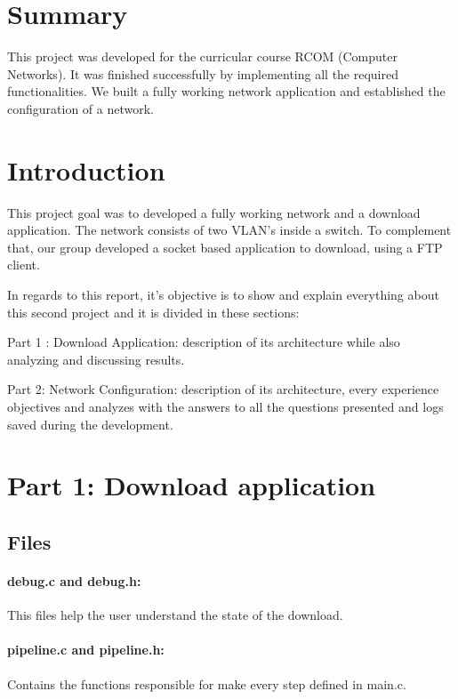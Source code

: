\documentclass[compilation.tex]{subfiles}
\begin{document}
	
	\section{Summary}
	\label{sec:summary}
	This project was developed for the curricular course RCOM (Computer Networks). It was finished successfully by implementing all the required functionalities. We built a fully working network application and established the configuration of a network.
	
	\section{Introduction}
	\label{sec:introduction}
	This project goal was to developed a fully working network and a download application. The network consists of two VLAN’s inside a switch. To complement that, our group developed a socket based application to download, using a FTP client.
	
	In regards to this report, it’s objective is to show and explain everything about this second project and it is divided in these sections:
	
	Part 1 : Download Application: description of its architecture while also analyzing and discussing results.
	
	Part 2: Network Configuration: description of its architecture, every experience objectives and analyzes with the answers to all the questions presented and logs saved during the development.
	
	\section{Part 1: Download application}
	\label{sec:downloadapp}
	\subsection{Files}
	\label{subsec:filesproject}
	
	\paragraph{debug.c and debug.h:}
	This files help the user understand the state of the download. 
	
	\paragraph{pipeline.c and pipeline.h:}
	Contains the functions responsible for make every step defined in main.c. 
\end{document}
